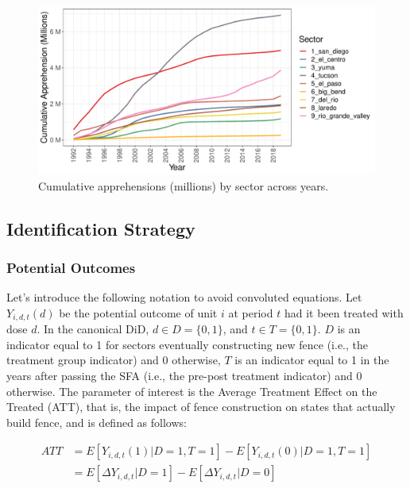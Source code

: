 \documentclass[titlepage]{article}
\theoremstyle{plain}
\theoremstyle{plain}
\begin{document}
\begin{figure}[H]
\centering
    \caption{Cumulative apprehensions (millions) by sector across years.} 
    \label{fig:plot_cum_app} 
    \includegraphics[width=\textwidth]{_images/plot_cum_app.pdf}
\end{figure}\textsc{}

\subsection*{Identification Strategy}

\subsubsection*{Potential Outcomes}

Let's introduce the following notation to avoid convoluted equations. Let $Y_{i,d,t}(d)$ be the potential outcome of unit $i$ at period $t$ had it been treated with dose $d$. In the canonical DiD, $d \in D=\{0,1\}$, and $t \in T=\{0,1\}$. $D$ is an indicator equal to 1 for sectors eventually constructing new fence (i.e., the treatment group indicator) and 0 otherwise, $T$ is an indicator equal to 1 in the years after passing the SFA (i.e., the pre-post treatment indicator) and 0 otherwise. The parameter of interest is the Average Treatment Effect on the Treated (ATT), that is, the impact of fence construction on states that actually build fence, and is defined as follows:

\begin{equation}
\label{eq:att_1}
\begin{split}
	\textit{ATT} &= E[Y_{i,d,t}(1)|D=1,T=1] - E[Y_{i,d,t}(0)|D=1,T=1]\\
	&= E[\Delta Y_{i,d,t}|D=1] - E[\Delta Y_{i,d,t}|D=0]
\end{split}
\end{equation}
\end{document}
